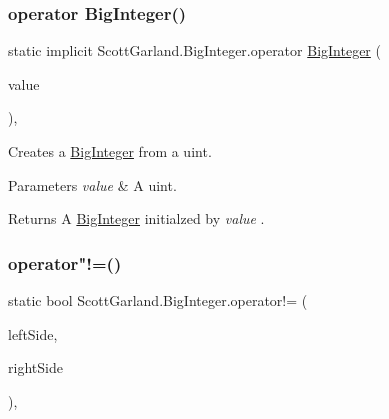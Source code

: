 \subsubsection{\texorpdfstring{operator Big\+Integer()}{operator BigInteger()}\hspace{0.1cm}{\footnotesize\ttfamily [4/4]}}
{\footnotesize\ttfamily static implicit Scott\+Garland.\+Big\+Integer.\+operator \hyperlink{class_scott_garland_1_1_big_integer}{Big\+Integer} (\begin{DoxyParamCaption}\item[{uint}]{value }\end{DoxyParamCaption})\hspace{0.3cm}{\ttfamily [inline]}, {\ttfamily [static]}}



Creates a \hyperlink{class_scott_garland_1_1_big_integer}{Big\+Integer} from a uint. 


\begin{DoxyParams}{Parameters}
{\em value} & A uint.\\
\hline
\end{DoxyParams}
\begin{DoxyReturn}{Returns}
A \hyperlink{class_scott_garland_1_1_big_integer}{Big\+Integer} initialzed by {\itshape value} .
\end{DoxyReturn}
\mbox{\label{class_scott_garland_1_1_big_integer_a55d1606d8b5694c6f6cd69aa658e1ad6}} 
\subsubsection{\texorpdfstring{operator"!=()}{operator!=()}}
{\footnotesize\ttfamily static bool Scott\+Garland.\+Big\+Integer.\+operator!= (\begin{DoxyParamCaption}\item[{\hyperlink{class_scott_garland_1_1_big_integer}{Big\+Integer}}]{left\+Side,  }\item[{\hyperlink{class_scott_garland_1_1_big_integer}{Big\+Integer}}]{right\+Side }\end{DoxyParamCaption})\hspace{0.3cm}{\ttfamily [inline]}, {\ttfamily [static]}}



